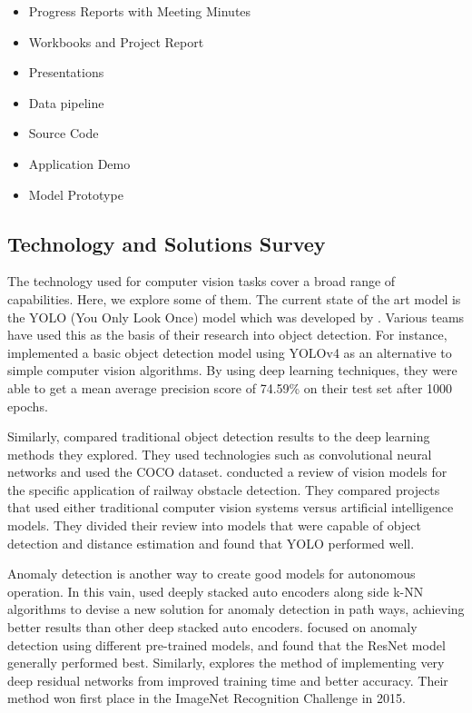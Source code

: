\documentclass[stu,12pt,floatsintext]{apa7}
\begin{document}
\begin{itemize}
	\item Progress Reports with Meeting Minutes
	\item Workbooks and Project Report
	\item Presentations
    \item Data pipeline
	\item Source Code
	\item Application Demo
	\item Model Prototype
\end{itemize}


\subsection{Technology and Solutions Survey}
The technology used for computer vision tasks cover a broad range of capabilities. Here, we explore some of them. The current state of the art model is the YOLO (You Only Look Once) model which was developed by \textcite{redmon_you_2016}. Various teams have used this as the basis of their research into object detection. For instance, \textcite{sarda_object_2021} implemented a basic object detection model using YOLOv4 as an alternative to simple computer vision algorithms. By using deep learning techniques, they were able to get a mean average precision score of 74.59\% on their test set after 1000 epochs.

Similarly, \textcite{gao_obstacle_2024} compared traditional object detection results to the deep learning methods they explored. They used technologies such as convolutional neural networks and used the COCO dataset. \textcite{ristic-durrant_review_2021} conducted a review of vision models for the specific application of railway obstacle detection. They compared projects that used either traditional computer vision systems versus artificial intelligence models. They divided their review into models that were capable of object detection and distance estimation and found that YOLO performed well.

Anomaly detection is another way to create good models for autonomous operation. In this vain, \textcite{dairi_obstacle_2018} used deeply stacked auto encoders along side k-NN algorithms to devise a new solution for anomaly detection in path ways, achieving better results than other deep stacked auto encoders. \textcite{wenning_anomaly_2022} focused on anomaly detection using different pre-trained models, and found that the ResNet model generally performed best. Similarly, \textcite{he_deep_2016} explores the method of implementing very deep residual networks from improved training time and better accuracy. Their method won first place in the ImageNet Recognition Challenge in 2015.
\end{document}
